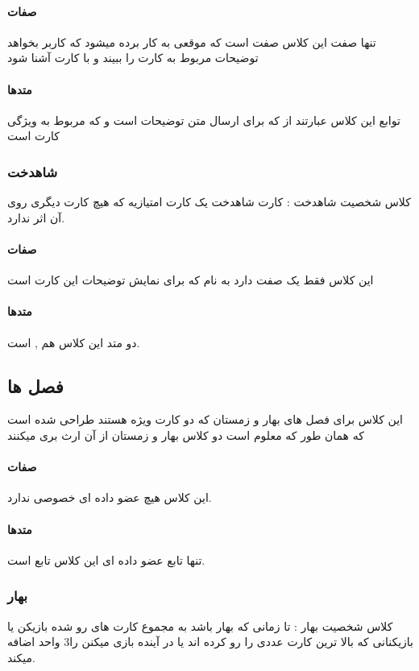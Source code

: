 \documentclass[pdf,titlepage,a4paper]{report}
\begin{document}
    \paragraph{صفات}
	تنها  صفت این کلاس صفت   است که موقعی به کار برده میشود که کاربر بخواهد توضیحات مربوط به کارت را ببیند و با کارت آشنا شود
	\paragraph{متدها}
	توابع این کلاس عبارتند از  
	 که برای ارسال متن توضیحات است 
	و  که مربوط به ویژگی کارت است
	\subsubsection{شاهدخت}
	 کلاس شخصیت شاهدخت : کارت شاهدخت یک کارت امتیازیه که هیچ کارت دیگری روی آن اثر ندارد.
	\paragraph{صفات}
	این کلاس فقط یک صفت دارد به نام   که برای نمایش توضیحات این کارت است
	\paragraph{متدها}
	 دو متد این کلاس هم  ,  است.
	
	\subsection{فصل ها}
    این کلاس برای فصل های بهار و زمستان که دو کارت ویژه هستند طراحی شده است که همان طور که معلوم است دو کلاس بهار و زمستان از آن ارث بری میکنند

	\paragraph{صفات}
	این کلاس هیچ عضو داده ای خصوصی ندارد.
	\paragraph{متدها}
	تنها تابع عضو داده ای این کلاس تابع  است.
	
	\subsubsection{بهار}
	 کلاس شخصیت بهار : تا زمانی که بهار باشد به مجموع کارت های رو شده بازیکن یا بازیکنانی که بالا ترین کارت عددی را رو کرده اند یا  در آینده بازی میکنن را3 واحد اضافه میکند.
\end{document}
